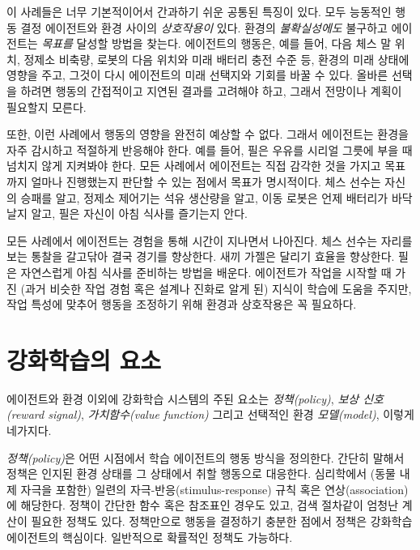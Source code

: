 이 사례들은 너무 기본적이어서 간과하기 쉬운 공통된 특징이 있다. 모두 능동적인
행동 결정 에이전트와 환경 사이의 \emph{상호작용이} 있다. 환경의
\emph{불확실성에도} 불구하고 에이전트는 \emph{목표를} 달성할 방법을 찾는다.
에이전트의 행동은, 예를 들어, 다음 체스 말 위치, 정제소 비축량, 로봇의 다음
위치와 미래 배터리 충전 수준 등, 환경의 미래 상태에 영향을 주고, 그것이 다시
에이전트의 미래 선택지와 기회를 바꿀 수 있다. 올바른 선택을 하려면 행동의
간접적이고 지연된 결과를 고려해야 하고, 그래서 전망이나 계획이 필요할지 모른다.

또한, 이런 사례에서 행동의 영향을 완전히 예상할 수 없다. 그래서 에이전트는
환경을 자주 감시하고 적절하게 반응해야 한다. 예를 들어, 필은 우유를 시리얼
그릇에 부을 때 넘치지 않게 지켜봐야 한다. 모든 사례에서 에이전트는 직접 감각한
것을 가지고 목표까지 얼마나 진행했는지 판단할 수 있는 점에서 목표가 명시적이다.
체스 선수는 자신의 승패를 알고, 정제소 제어기는 석유 생산량을 알고, 이동 로봇은
언제 배터리가 바닥날지 알고, 필은 자신이 아침 식사를 즐기는지 안다.


모든 사례에서 에이전트는 경험을 통해 시간이 지나면서 나아진다. 체스 선수는
자리를 보는 통찰을 갈고닦아 결국 경기를 향상한다. 새끼 가젤은 달리기 효율을
향상한다. 필은 자연스럽게 아침 식사를 준비하는 방법을 배운다. 에이전트가 작업을
시작할 때 가진 (과거 비슷한 작업 경험 혹은 설계나 진화로 알게 된) 지식이 학습에
도움을 주지만, 작업 특성에 맞추어 행동을 조정하기 위해 환경과 상호작용은 꼭
필요하다.

\section{강화학습의 요소}

에이전트와 환경 이외에 강화학습 시스템의 주된 요소는 \emph{정책(policy)},
\emph{보상 신호(reward signal)}, \emph{가치함수(value function)} 그리고 선택적인
환경 \emph{모델(model)}, 이렇게  네가지다.

\emph{정책(policy)}은 어떤 시점에서 학습 에이전트의 행동 방식을 정의한다. 간단히
말해서 정책은 인지된 환경 상태를 그 상태에서 취할 행동으로 대응한다. 심리학에서
(동물 내제 자극을 포함한) 일련의 자극-반응(stimulus-response) 규칙 혹은
연상(association)에 해당한다. 정책이 간단한 함수 혹은 참조표인 경우도 있고, 검색
절차같이 엄청난 계산이 필요한 정책도 있다. 정책만으로 행동을 결정하기 충분한
점에서 정책은 강화학습 에이전트의 핵심이다. 일반적으로 확률적인 정책도 가능하다.

